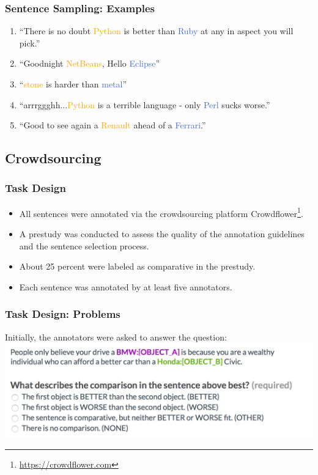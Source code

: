 \documentclass[11pt,aspectratio=169,usenames,dvipsnames]{beamer}
\begin{document}
    \begin{frame}[t]
        \frametitle{Sentence Sampling: Examples}
        \begin{enumerate}
            \item \enquote{There is no doubt \textcolor{orange}{Python} is better than \textcolor{RoyalBlue}{Ruby} at any in aspect you will pick.}
            \item \enquote{Goodnight \textcolor{orange}{NetBeans}, Hello \textcolor{RoyalBlue}{Eclipse}}
            \item \enquote{\textcolor{orange}{stone} is harder than \textcolor{RoyalBlue}{metal}}
            \item \enquote{arrrggghh...\textcolor{orange}{Python} is a terrible language - only \textcolor{RoyalBlue}{Perl} sucks worse.}
            \item \enquote{Good to see again a \textcolor{orange}{Renault} ahead of a \textcolor{RoyalBlue}{Ferrari}.}
        \end{enumerate}
    \end{frame}

    \subsection{Crowdsourcing}
    \frame{\subsectionpage}
    \begin{frame}[t]
        \frametitle{Task Design}
        \begin{itemize}
            \item All sentences were annotated via the crowdsourcing platform Crowdflower\footnote{\url{https://crowdflower.com}}.
            \item A prestudy was conducted to assess the quality of the annotation guidelines and the sentence selection process.
            \item About 25 percent were labeled as comparative in the prestudy.
            \item Each sentence was annotated by at least five annotators.
        \end{itemize}

    \end{frame}

    \begin{frame}[t]
        \frametitle{Task Design: Problems}
        Initially, the annotators were asked to answer the question:
        \includegraphics[scale=0.3]{images/q1other}
    \end{frame}
\end{document}
